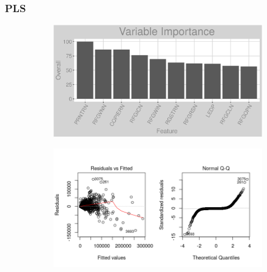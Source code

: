 \subsubsection{PLS}
\label{appendix:electricity:pls}
\begin{figure}[h]
\centering
\begin{subfigure}{1\textwidth}
\centering
\includegraphics[width=.99\textwidth, height=0.3\textheight]{Images/electricity_pls_vars.png}
\end{subfigure}
\begin{subfigure}{1\textwidth}
\centering
\includegraphics[width=.99\textwidth, height=0.475\textheight]{Images/electricity_pls_res_1.png}
\end{subfigure}
\end{figure}
\newpage
